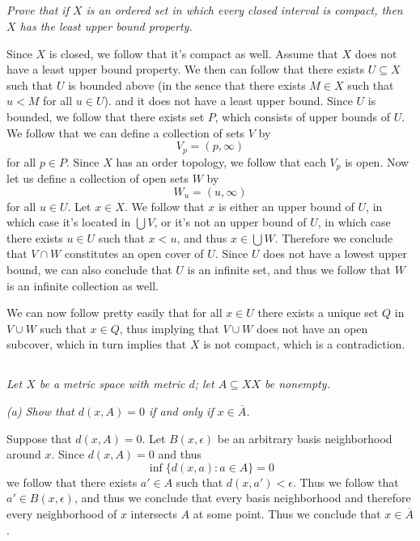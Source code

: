 \documentclass[11pt,oneside,titlepage]{book}
\newcommand{\set}[1]{\{ #1 \}}
\begin{document}
\subsection{}

\textit{Prove that if $X$ is an ordered set in which every closed interval is compact, then $X$
  has the least upper bound property.}

Since $X$ is closed, we follow that it's compact as well. Assume that $X$ does not have a
least upper bound property. We then can follow that there exists $U \subseteq X$ such that
$U$ is bounded above (in the sence that there exists $M \in X$ such that $u < M$ for all $u \in U$).
and it does not have a least upper bound. Since $U$ is bounded, we follow that there exists
set $P$, which consists of upper bounds of $U$. We follow that we can define a collection of sets
$V$ by
$$V_p = (p, \infty)$$
for all $p \in P$. Since $X$ has an order topology, we follow that each $V_p$ is open. Now
let us define a collection of open sets $W$ by
$$W_u = (u, \infty)$$
for all $u \in U$. Let $x \in X$. We follow that $x$ is either an upper bound of $U$, in which
case it's located in $\bigcup{V}$, or it's not an upper bound of $U$, in which case there
exists $u \in U$ such that $x < u$, and thus $x \in \bigcup{W}$. Therefore we conclude that
$V \cap W$ constitutes an open cover of $U$. Since $U$ does not have a lowest upper bound,
we can also conclude that $U$ is an infinite set, and thus we follow that $W$ is an infinite
collection as well.

We can now follow pretty easily that for all $x \in U$ there exists a unique set $Q$ in $V \cup W$
such that $x \in Q$, thus implying that $V \cup W$ does not have an open subcover, which
in turn implies that $X$ is not compact, which is a contradiction.

\subsection{}

\textit{Let $X$ be a metric space with metric $d$; let $A \subseteq XX$ be nonempty.}

\textit{(a) Show that $d(x, A) = 0$ if and only if $x \in \overline{A}$.}

Suppose that $d(x, A) = 0$. Let $B(x, \epsilon)$ be an arbitrary basis neighborhood around $x$.
Since $d(x, A) = 0$ and thus
$$\inf\set{d(x, a): a \in A} = 0$$
we follow that there exists $a' \in A$ such that $d(x, a') < \epsilon$. Thus we follow that
$a' \in B(x, \epsilon)$, and thus we conclude that every basis neighborhood and therefore
every neighborhood of $x$ intersects $A$ at some point. Thus we conclude that $x \in \overline{A}$.
\end{document}
